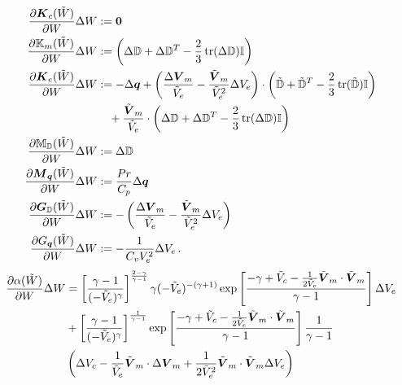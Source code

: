 \documentclass[Dissertation.tex]{subfiles}
\begin{document}
\begin{align*}
\frac{\partial\boldsymbol K_c(\tilde W)}{\partial W}\Delta W&:=
	\boldsymbol 0\\
\frac{\partial\mathbb{K}_m(\tilde W)}{\partial W}\Delta W&:=
	\left( \Delta\mathbb{D}+\Delta\mathbb{D}^T-\frac{2}{3}\operatorname*{tr}(\Delta\mathbb{D})\mathbb{I} \right)
	\\
\frac{\partial\boldsymbol K_e(\tilde W)}{\partial W}\Delta W&:=
	-\Delta\boldsymbol q+
	\left( \frac{\Delta\boldsymbol V_m}{\tilde V_e}-\frac{\tilde{\boldsymbol V}_m}{\tilde V_e^2}\Delta V_e \right)
	\cdot\left( \tilde{\mathbb{D}}+\tilde{\mathbb{D}}^T-\frac{2}{3}\operatorname*{tr}(\tilde{\mathbb{D}})\mathbb{I} \right)
	\\&\quad
	+\frac{\tilde{\boldsymbol V}_m}{\tilde V_e}\cdot\left( \Delta\mathbb{D}+\Delta\mathbb{D}^T-\frac{2}{3}\operatorname*{tr}(\Delta\mathbb{D})\mathbb{I} \right)\\
\frac{\partial\mathbb{M}_{\mathbb{D}}(\tilde W)}{\partial W}\Delta W&:=
	\Delta\mathbb{D}
	\\
\frac{\partial\boldsymbol M_{\boldsymbol q}(\tilde W)}{\partial W}\Delta W&:=
	\frac{Pr}{C_p}\Delta\boldsymbol q
	\\
\frac{\partial\boldsymbol G_{\mathbb{D}}(\tilde W)}{\partial W}\Delta W&:=
	-\left( \frac{\Delta\boldsymbol V_m}{\tilde V_e}-\frac{\tilde{\boldsymbol V}_m}{\tilde V_e^2}\Delta V_e \right)
	\\
\frac{\partial G_{\boldsymbol q}(\tilde W)}{\partial W}\Delta W&:=
	-\frac{1}{C_vV_e^2}\Delta V_e
	\,.
\end{align*}
\begin{align*}
\frac{\partial\alpha(\tilde W)}{\partial W}\Delta W&=
\left[ \frac{\gamma-1}{(-\tilde V_e)^\gamma} \right]^{\frac{2-\gamma}{\gamma-1}}
\gamma(-\tilde V_e)^{-(\gamma+1)}
\exp\left[ \frac{-\gamma+\tilde V_c-\frac{1}{2\tilde V_e}\tilde{\boldsymbol V}_m\cdot\tilde{\boldsymbol V}_m}{\gamma-1} \right]
\Delta V_e\\
&+\left[ \frac{\gamma-1}{(-\tilde V_e)^\gamma} \right]^{\frac{1}{\gamma-1}}
\exp\left[ \frac{-\gamma+\tilde V_c-\frac{1}{2\tilde V_e}\tilde{\boldsymbol V}_m\cdot\tilde{\boldsymbol V}_m}{\gamma-1} \right]
\frac{1}{\gamma-1}\\
&\left( \Delta V_c
-\frac{1}{\tilde V_e}\tilde{\boldsymbol V}_m\cdot\Delta\boldsymbol V_m
+\frac{1}{2\tilde V_e^2}\tilde{\boldsymbol V}_m\cdot\tilde{\boldsymbol V}_m\Delta V_e
 \right)
\end{align*}
\end{document}
